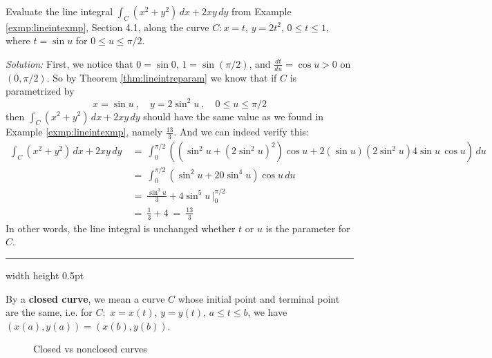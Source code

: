 \begin{exmp}
 Evaluate the line integral $\int_C (x^2 + y^2 )\,dx + 2xy\,dy$ from Example \ref{exmp:lineintexmp}, Section 4.1, along
 the curve $C: x=t$, $y=2t^2$, $0 \le t \le 1$, where $t=\sin u$ for $0 \le u \le \pi/2$.\smallskip
 \par\noindent \emph{Solution:} First, we notice that $0=\sin 0$, $1=\sin (\pi/2)$, and $\frac{dt}{du} = \cos u > 0$ on
 $(0,\pi/2)$. So by Theorem \ref{thm:lineintreparam} we know that if $C$ is parametrized by
 \begin{displaymath}
  x=\sin u ~,\quad y = 2\sin^2 u ~,\quad 0 \le u \le \pi/2
 \end{displaymath}
 then $\int_C (x^2 + y^2 )\,dx + 2xy\,dy$ should have the same value as we found in Example \ref{exmp:lineintexmp},
 namely $\frac{13}{3}$. And we can indeed verify this:
 \begin{align*}
  \int_C (x^2 + y^2 )\,dx + 2xy\,dy ~&=~ \int_0^{\pi/2} \left( (\sin^2 u + (2\sin^2 u)^2) \cos u +
   2(\sin u)(2\sin^2 u) 4\sin u \, \cos u \right)\,du\\
   &=~ \int_0^{\pi/2} \left( \sin^2 u + 20\sin^4 u \right) \cos u\,du\\
   &=~ \frac{\sin^3 u}{3} + 4\sin^5 u \,\Bigg|_0^{\pi/2}\\
   &=~ \frac{1}{3} + 4 ~=~ \frac{13}{3}
 \end{align*}
 In other words, the line integral is unchanged whether $t$ or $u$ is the parameter for $C$.
\end{exmp}
\hrule width \textwidth height 0.5pt
\medskip

By a \textbf{closed curve}, we mean a curve $C$ whose initial point and terminal point are the same, i.e. for $C:$
$x=x(t)$, $y=y(t)$, $a \le t \le b$, we have $(x(a),y(a)) = (x(b),y(b))$.

\begin{figure}[h]
 \centering
 \qquad\qquad
 \caption[]{\quad Closed vs nonclosed curves}
 \label{fig:closedcurve}
\end{figure}

